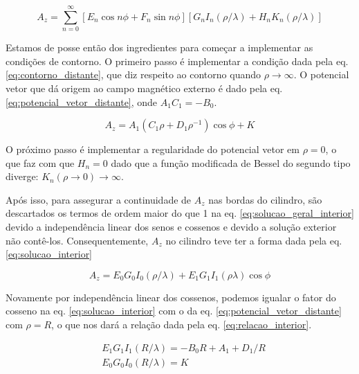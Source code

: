\documentclass[%
 reprint,
 amsmath,amssymb,
 aps,
]{revtex4-1}
\begin{document}
\begin{equation}
    \label{eq:solucao_geral_interior}
    A_z = \sum_{n=0}^{\infty}[E_n \cos{n\phi} + F_n\sin{n\phi}] [G_n I_n (\rho / \lambda) + H_n K_n (\rho / \lambda)] 
\end{equation}

Estamos de posse então dos ingredientes para começar a implementar as condições de contorno. O primeiro passo é implementar a condição dada pela eq. \ref{eq:contorno_distante}, que diz respeito ao contorno quando $\rho \rightarrow \infty$. O potencial vetor que dá origem ao campo magnético externo é dado pela eq. \ref{eq:potencial_vetor_distante}, onde $A_1 C_1 = -B_0$.





\begin{equation}
    \label{eq:potencial_vetor_distante}
    A_z = A_1(C_1 \rho + D_1 \rho^{-1}) \cos{\phi} + K
\end{equation}


O próximo passo é implementar a regularidade do potencial vetor em $\rho = 0$, o que faz com que $H_n = 0$ dado que a função modificada de Bessel do segundo tipo diverge: $K_n(\rho \rightarrow 0) \rightarrow \infty$. 

Após isso, para assegurar a continuidade de $A_z$ nas bordas do cilindro, são descartados os termos de ordem maior do que 1 na eq. \ref{eq:solucao_geral_interior} devido a independência linear dos senos e cossenos e devido a solução exterior não contê-los. Consequentemente, $A_z$ no cilindro teve ter a forma dada pela eq. \ref{eq:solucao_interior}

\begin{equation}
    \label{eq:solucao_interior}
    A_z = E_0 G_0 I_0 (\rho / \lambda) + E_1 G_1 I_1 (\rho \lambda) \cos{\phi}
\end{equation}

Novamente por independência linear dos cossenos, podemos igualar o fator do cosseno na eq. \ref{eq:solucao_interior} com o da eq. \ref{eq:potencial_vetor_distante} com $\rho = R$, o que nos dará a relação dada pela eq. \ref{eq:relacao_interior}.

\begin{equation}
    \label{eq:relacao_interior}
    \begin{split}
        &E_1 G_1 I_1 (R / \lambda) = -B_0 R + A_1 + D_1 / R \\
        &E_0 G_0 I_0 (R / \lambda) = K
    \end{split}
\end{equation}
\end{document}
